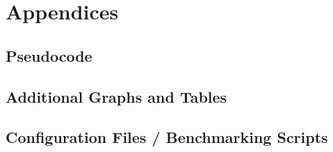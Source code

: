 \chapter{Appendices}
\section{Pseudocode}
\section{Additional Graphs and Tables}
\section{Configuration Files / Benchmarking Scripts}